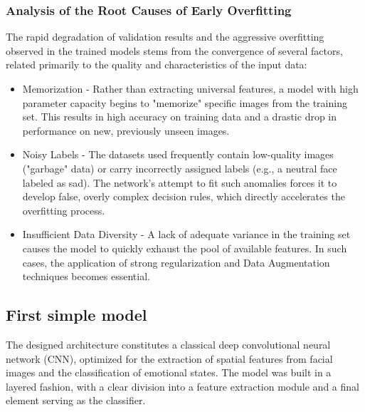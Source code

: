 \documentclass{article}
\begin{document}
\subsubsection{Analysis of the Root Causes of Early Overfitting}
The rapid degradation of validation results and the aggressive overfitting observed in the trained models stems from the convergence of several factors, related primarily to the quality and characteristics of the input data:
\begin{itemize}
    \item Memorization - Rather than extracting universal features, a model with high parameter capacity begins to "memorize" specific images from the training set. This results in high accuracy on training data and a drastic drop in performance on new, previously unseen images.
    \item Noisy Labels - The datasets used frequently contain low-quality images ("garbage" data) or carry incorrectly assigned labels (e.g., a neutral face labeled as sad). The network's attempt to fit such anomalies forces it to develop false, overly complex decision rules, which directly accelerates the overfitting process.
    \item Insufficient Data Diversity - A lack of adequate variance in the training set causes the model to quickly exhaust the pool of available features. In such cases, the application of strong regularization and Data Augmentation techniques becomes essential.
\end{itemize}

\subsection{First simple model}
The designed architecture constitutes a classical deep convolutional neural network (CNN), optimized for the extraction of spatial features from facial images and the classification of emotional states. The model was built in a layered fashion, with a clear division into a feature extraction module and a final element serving as the classifier.
\end{document}
